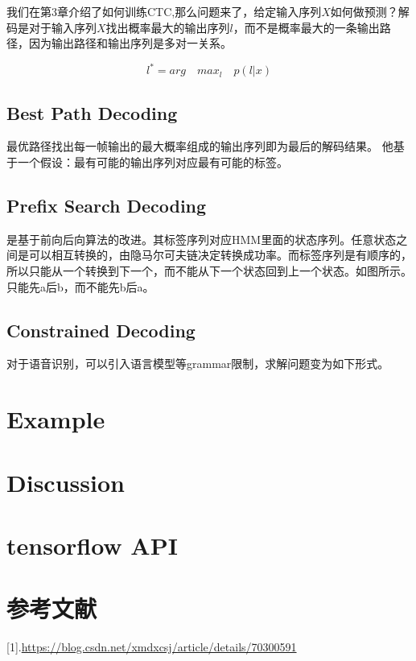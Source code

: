 \documentclass[]{book}
\theoremstyle{definition}
\theoremstyle{definition}
\theoremstyle{definition}
\theoremstyle{remark}
\begin{document}
我们在第3章介绍了如何训练CTC,那么问题来了，给定输入序列\(X\)如何做预测？解码是对于输入序列\(X\)找出概率最大的输出序列\(l\)，而不是概率最大的一条输出路径，因为输出路径和输出序列是多对一关系。

\[l^{*}=arg \quad max_{l}\quad p(l|x)\]

\section{Best Path Decoding}\label{best-path-decoding}

最优路径找出每一帧输出的最大概率组成的输出序列即为最后的解码结果。
他基于一个假设：最有可能的输出序列对应最有可能的标签。

\section{Prefix Search Decoding}\label{prefix-search-decoding}

是基于前向后向算法的改进。其标签序列对应HMM里面的状态序列。任意状态之间是可以相互转换的，由隐马尔可夫链决定转换成功率。而标签序列是有顺序的，所以只能从一个转换到下一个，而不能从下一个状态回到上一个状态。如图所示。只能先a后b，而不能先b后a。

\section{Constrained Decoding}\label{constrained-decoding}

对于语音识别，可以引入语言模型等grammar限制，求解问题变为如下形式。

\chapter{Example}\label{example}

\chapter{Discussion}\label{discussion}

\chapter{tensorflow API}\label{tensorflow-api}

\chapter{参考文献}

{[}1{]}.\url{https://blog.csdn.net/xmdxcsj/article/details/70300591}
\end{document}
